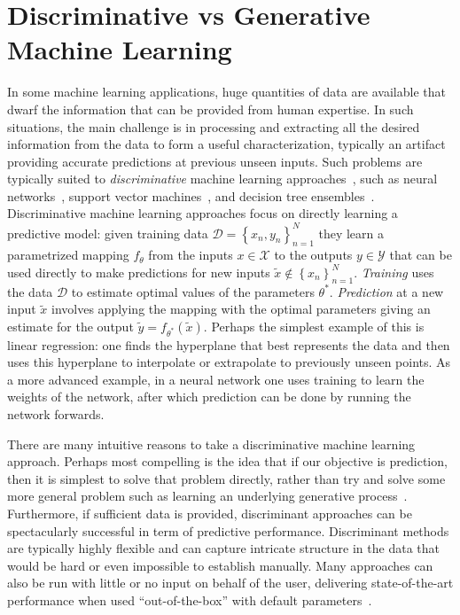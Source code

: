 
\section{Discriminative vs Generative Machine Learning}
\label{sec:bayes:discrim}

In some machine learning applications, huge quantities of data are available that dwarf the information
that can be provided from human expertise.  In such situations, the main challenge is in processing
and extracting all the desired information from the data to form a useful characterization,
typically an artifact providing accurate predictions at previous unseen inputs. 
Such problems are typically suited to \emph{discriminative} 
machine learning approaches~\citep{breiman2001statistical,vapnik1998statistical}, such as neural
networks~\citep{rumelhart1986learning,bishop1995neural}, 
support vector machines~\citep{cortes1995support,scholkopf2002learning}, and decision tree 
ensembles~\citep{breiman2001random,rainforth2015canonical}.  Discriminative machine learning approaches
focus on directly learning a predictive model: given training data $\mathcal{D} = \left\{x_n,y_n\right\}_{n=1}^N$
they learn a parametrized mapping $f_{\theta}$ from the inputs $x \in \mathcal{X}$ to the 
outputs $y\in\mathcal{Y}$ that can 
be used directly to make predictions 
for new inputs $\tilde{x} \notin \left\{x_n\right\}_{n=1}^N$.  \emph{Training}
uses the data $\mathcal{D}$ to estimate optimal values of the parameters $\theta^*$. \emph{Prediction}
at a new input $\tilde{x}$ involves applying the mapping with the optimal parameters giving an estimate for the output
$\tilde{y} = f_{\theta^*}(\tilde{x})$.  Perhaps the simplest example of this is linear regression: one finds
the hyperplane that best represents the data and then uses this hyperplane to interpolate or extrapolate
to previously unseen points.  
As a more advanced example, in a neural network one uses training to learn the
weights of the network, after which prediction can be done by running the network forwards.  

There are many intuitive reasons to take a discriminative machine learning 
approach.  Perhaps most compelling is the
idea that if our objective is prediction, then it is simplest to solve that problem directly, rather
than try and solve some more general problem such as learning an underlying generative 
process~\citep{vapnik1998statistical,breiman2001statistical}. Furthermore, if sufficient
data is provided, discriminant approaches can be spectacularly successful in term of predictive
performance.  Discriminant methods are typically highly flexible and can capture intricate structure in the data that
would be hard or even impossible to establish manually.  Many approaches can also be run with little
or no input on behalf of the user, delivering state-of-the-art performance when used
``out-of-the-box'' with default parameters~\citep{rainforth2015canonical}.  

